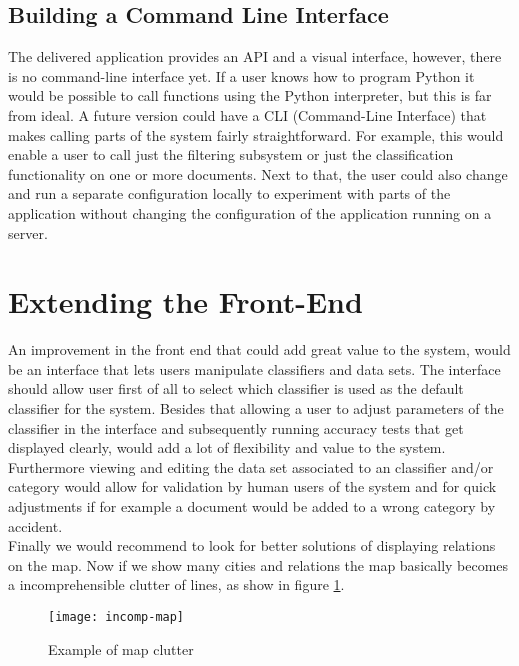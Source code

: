 \subsection{Building a Command Line Interface}
The delivered application provides an API and a visual interface, however, there is no command-line interface yet. If a user knows how to program Python it would be possible to call functions using the Python interpreter, but this is far from ideal. A future version could have a CLI (Command-Line Interface) that makes calling parts of the system fairly straightforward. For example, this would enable a user to call just the filtering subsystem or just the classification functionality on one or more documents. Next to that, the user could also change and run a separate configuration locally to experiment with parts of the application without changing the configuration of the application running on a server.

\section{Extending the Front-End}
An improvement in the front end that could add great value to the system, would be an interface that lets users manipulate classifiers and data sets. The interface should allow user first of all to select which classifier is used as the default classifier for the system. Besides that allowing a user to adjust parameters of the classifier in the interface and subsequently running accuracy tests that get displayed clearly, would add a lot of flexibility and value to the system.\\
Furthermore viewing and editing the data set associated to an classifier and/or category would allow for validation by human users of the system and for quick adjustments if for example a document would be added to a wrong category by accident.\\
Finally we would recommend to look for better solutions of displaying relations on the map. Now if we show many cities and relations the map basically becomes a incomprehensible clutter of lines, as show in figure \ref{fig:incomp-map}.

\begin{figure}[H]
\centering
\texttt{[image: incomp-map]}
\caption{Example of map clutter}
\label{fig:incomp-map}
\end{figure}
